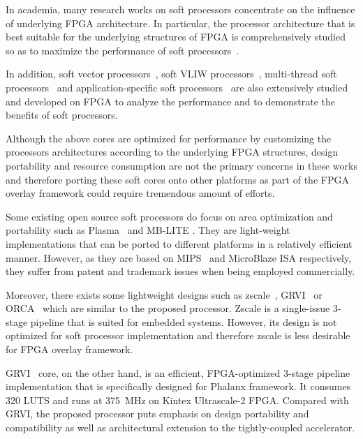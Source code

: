 In academia, many research works on soft processors concentrate on the influence of underlying FPGA architecture. In particular, the processor architecture that is best suitable for the underlying structures of FPGA is comprehensively studied so as to maximize the performance of soft processors~\cite{idea, octavo}. 

In addition, soft vector processors~\cite{guy_vector, vespa, vegas}, soft VLIW processors~\cite{delay_vliw, custom_vliw}, multi-thread soft processors~\cite{wayne_custard, spree} and application-specific soft processors~\cite{network_processor, network_processor_cn} are also extensively studied and developed on FPGA to analyze the performance and to demonstrate the benefits of soft processors.

Although the above cores are optimized for performance by customizing the processors architectures according to the underlying FPGA structures, design portability and resource consumption are not the primary concerns in these works and therefore porting these soft cores onto other platforms as part of the FPGA overlay framework could require tremendous amount of efforts.

Some existing open source soft processors do focus on area optimization and portability such as Plasma~\cite{plasma} and MB-LITE \cite{mblite}. They are light-weight implementations that can be ported to different platforms in a relatively efficient manner. However, as they are based on MIPS~\cite{mips} and MicroBlaze ISA respectively, they suffer from patent and trademark issues when being employed commercially.

Moreover, there exists some lightweight  designs such as zscale~\cite{zscale}, GRVI~\cite{grvi} or ORCA~\cite{vectorblox} which are similar to the proposed processor. Zscale is a single-issue 3-stage pipeline that is suited for embedded systems. However, its design is not optimized for soft processor implementation and therefore zscale is less desirable for FPGA overlay framework.

GRVI~\cite{grvi} core, on the other hand, is an efficient, FPGA-optimized 3-stage pipeline implementation that is specifically designed for Phalanx framework. It consumes 320 LUTS and runs at \SI{375}{\mega\hertz} on Kintex Ultrascale-2 FPGA. Compared with GRVI, the proposed processor puts emphasis on design portability and compatibility as well as architectural extension to the tightly-coupled accelerator. 

